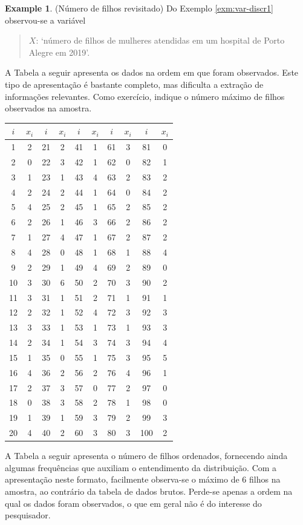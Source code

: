 \documentclass[
]{book}
\theoremstyle{definition}
\theoremstyle{definition}
\newtheorem{example}{Example}[chapter]
\theoremstyle{definition}
\theoremstyle{remark}
\begin{document}
\begin{example}
\protect\hypertarget{exm:filhos}{}{\label{exm:filhos} }(Número de filhos revisitado) Do Exemplo \ref{exm:var-discr1} observou-se a variável

\begin{quote}
\(X\): `número de filhos de mulheres atendidas em um hospital de Porto Alegre em 2019'.
\end{quote}

A Tabela a seguir apresenta os dados na ordem em que foram observados. Este tipo de apresentação é bastante completo, mas dificulta a extração de informações relevantes. Como exercício, indique o número máximo de filhos observados na amostra.

\begin{longtable}[]{@{}cccccccccc@{}}
\toprule
\(i\) & \(x_{i}\) & \(i\) & \(x_{i}\) & \(i\) & \(x_{i}\) & \(i\) & \(x_{i}\) & \(i\) & \(x_{i}\)\tabularnewline
\midrule
\endhead
1 & 2 & 21 & 2 & 41 & 1 & 61 & 3 & 81 & 0\tabularnewline
2 & 0 & 22 & 3 & 42 & 1 & 62 & 0 & 82 & 1\tabularnewline
3 & 1 & 23 & 1 & 43 & 4 & 63 & 2 & 83 & 2\tabularnewline
4 & 2 & 24 & 2 & 44 & 1 & 64 & 0 & 84 & 2\tabularnewline
5 & 4 & 25 & 2 & 45 & 1 & 65 & 2 & 85 & 2\tabularnewline
6 & 2 & 26 & 1 & 46 & 3 & 66 & 2 & 86 & 2\tabularnewline
7 & 1 & 27 & 4 & 47 & 1 & 67 & 2 & 87 & 2\tabularnewline
8 & 4 & 28 & 0 & 48 & 1 & 68 & 1 & 88 & 4\tabularnewline
9 & 2 & 29 & 1 & 49 & 4 & 69 & 2 & 89 & 0\tabularnewline
10 & 3 & 30 & 6 & 50 & 2 & 70 & 3 & 90 & 2\tabularnewline
11 & 3 & 31 & 1 & 51 & 2 & 71 & 1 & 91 & 1\tabularnewline
12 & 2 & 32 & 1 & 52 & 4 & 72 & 3 & 92 & 3\tabularnewline
13 & 3 & 33 & 1 & 53 & 1 & 73 & 1 & 93 & 3\tabularnewline
14 & 2 & 34 & 1 & 54 & 3 & 74 & 3 & 94 & 4\tabularnewline
15 & 1 & 35 & 0 & 55 & 1 & 75 & 3 & 95 & 5\tabularnewline
16 & 4 & 36 & 2 & 56 & 2 & 76 & 4 & 96 & 1\tabularnewline
17 & 2 & 37 & 3 & 57 & 0 & 77 & 2 & 97 & 0\tabularnewline
18 & 0 & 38 & 3 & 58 & 2 & 78 & 1 & 98 & 0\tabularnewline
19 & 1 & 39 & 1 & 59 & 3 & 79 & 2 & 99 & 3\tabularnewline
20 & 4 & 40 & 2 & 60 & 3 & 80 & 3 & 100 & 2\tabularnewline
\bottomrule
\end{longtable}
\end{example}

A Tabela a seguir apresenta o número de filhos ordenados, fornecendo ainda algumas frequências que auxiliam o entendimento da distribuição. Com a apresentação neste formato, facilmente observa-se o máximo de 6 filhos na amostra, ao contrário da tabela de dados brutos. Perde-se apenas a ordem na qual os dados foram observados, o que em geral não é do interesse do pesquisador.
\end{document}
